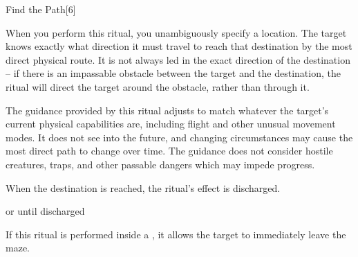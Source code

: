 \begin{spellsection}{Find the Path}[6]
    \begin{spellheader}
    \end{spellheader}
    \begin{spellcontent}
        \begin{spelltargetinginfo}
        \end{spelltargetinginfo}
        \begin{spelleffects}
            \spelleffect When you perform this ritual, you unambiguously specify a location. The target knows exactly what direction it must travel to reach that destination by the most direct physical route. It is not always led in the exact direction of the destination -- if there is an impassable obstacle between the target and the destination, the ritual will direct the target around the obstacle, rather than through it.

            The guidance provided by this ritual adjusts to match whatever the target's current physical capabilities are, including flight and other unusual movement modes. It does not see into the future, and changing circumstances may cause the most direct path to change over time. The guidance does not consider hostile creatures, traps, and other passable dangers which may impede progress.

            When the destination is reached, the ritual's effect is discharged.

            \spelldur \durext or until discharged \dismissable
        \end{spelleffects}
    \end{spellcontent}
    \begin{spellfooter}
        \spellnotes If this ritual is performed inside a , it allows the target to immediately leave the maze.

    \end{spellfooter}
\end{spellsection}

